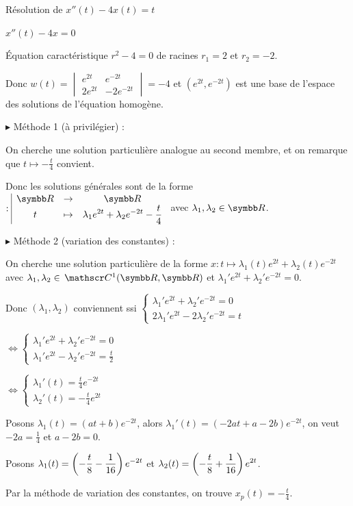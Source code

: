 \begin{exemple}
    Résolution de $x''(t) - 4x(t) = t$

     $x''(t) - 4x = 0$

    \svspace \'Equation caractéristique $r^2 - 4 = 0$ de racines $r_1 = 2$ et $r_2 = -2$.

    Donc $w(t) = \begin{vmatrix}
    e^{2t} & e^{-2t} \\
    2e^{2t} & -2e^{-2t}
    \end{vmatrix} = -4$ et $(e^{2t}, e^{-2t})$ est une base de l'espace des solutions de l'équation homogène.


    \svspace $\blacktriangleright$ Méthode 1 (à privilégier) : 

    On cherche une solution particulière analogue au second membre, et on remarque que $t \mapsto - \frac t 4$ convient. 

    Donc les solutions générales sont de la forme $\fonction{}\R \R t {\lambda_1 e^{2t} + \lambda_2 e^{-2t} - \frac t 4}$ avec $\lambda_1, \lambda_2 \in \R$.

    \lvspace $\blacktriangleright$ Méthode 2 (variation des constantes) :

    On cherche une solution particulière de la forme $x : t \mapsto \lambda_1(t) e^{2t} + \lambda_2(t) e^{-2t}$ 
    avec $\lambda_1, \lambda_2 \in \mc 1(\R, \R)$ et $\lambda_1' e^{2t} + \lambda_2' e^{-2t} = 0$.

    Donc $(\lambda_1, \lambda_2)$ conviennent ssi 
    $\begin{cases}
        \lambda_1' e^{2t} + \lambda_2' e^{-2t} = 0 \\
        2 \lambda_1' e^{2t} - 2 \lambda_2' e^{-2t} = t
    \end{cases}$ 

    $\Leftrightarrow \begin{cases}
    \lambda_1' e^{2t} + \lambda_2' e^{-2t} = 0 \\
    \lambda_1' e^{2t} - \lambda_2' e^{-2t} = \frac t 2
    \end{cases}$

    $\Leftrightarrow \begin{cases}
    \lambda_1'(t) = \frac t 4 e^{-2t} \\
    \lambda_2'(t) = -\frac t 4 e^{2t}
    \end{cases}$

    Posons $\lambda_1(t) = (at + b) e^{-2t}$, alors $\lambda_1'(t) = (-2a t + a - 2b) e^{-2t}$,
    on veut $-2a = \frac 1 4$ et $a - 2b = 0$.

    Posons $\lambda_1(t) = \displaystyle \left( - \frac t 8 - \frac 1 {16} \right) e^{-2t}$
    et $\lambda_2(t) = \displaystyle \left( - \frac t 8 + \frac 1 {16} \right) e^{2t}$. 

    Par la méthode de variation des constantes, on trouve $x_p(t) = - \frac t 4$. 
\end{exemple}

